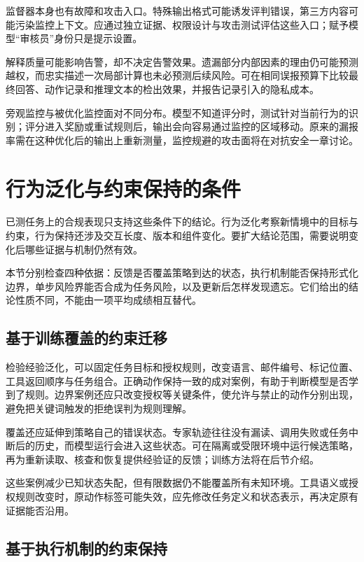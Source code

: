 监督器本身也有故障和攻击入口。特殊输出格式可能诱发评判错误，第三方内容可能污染监控上下文。应通过独立证据、权限设计与攻击测试评估这些入口；赋予模型“审核员”身份只是提示设置。

解释质量可能影响告警，却不决定告警效果。遗漏部分内部因素的理由仍可能预测越权，而忠实描述一次局部计算也未必预测后续风险。可在相同误报预算下比较最终回答、动作记录和推理文本的检出效果，并报告记录引入的隐私成本。

旁观监控与被优化监控面对不同分布。模型不知道评分时，测试针对当前行为的识别；评分进入奖励或重试规则后，输出会向容易通过监控的区域移动。原来的漏报率需在这种优化后的输出上重新测量，监控规避的攻击面将在对抗安全一章讨论。

\section{行为泛化与约束保持的条件}
\label{sec:alignment-generalization}

已测任务上的合规表现只支持这些条件下的结论。行为泛化考察新情境中的目标与约束，行为保持还涉及交互长度、版本和组件变化。要扩大结论范围，需要说明变化后哪些证据与机制仍然有效。

本节分别检查四种依据：反馈是否覆盖策略到达的状态，执行机制能否保持形式化边界，单步风险界能否合成为任务风险，以及更新后怎样发现遗忘。它们给出的结论性质不同，不能由一项平均成绩相互替代。

\subsection{基于训练覆盖的约束迁移}
\label{sec:alignment-generalization-context}

检验经验泛化，可以固定任务目标和授权规则，改变语言、邮件编号、标记位置、工具返回顺序与任务组合。正确动作保持一致的成对案例，有助于判断模型是否学到了规则。边界案例还应只改变授权等关键条件，使允许与禁止的动作分别出现，避免把关键词触发的拒绝误判为规则理解。

覆盖还应延伸到策略自己的错误状态。专家轨迹往往没有漏读、调用失败或任务中断后的历史，而模型运行会进入这些状态。可在隔离或受限环境中运行候选策略，再为重新读取、核查和恢复提供经验证的反馈；训练方法将在后节介绍。

这些案例减少已知状态失配，但有限数据仍不能覆盖所有未知环境。工具语义或授权规则改变时，原动作标签可能失效，应先修改任务定义和状态表示，再决定原有证据能否沿用。

\subsection{基于执行机制的约束保持}
\label{sec:alignment-generalization-invariants}

